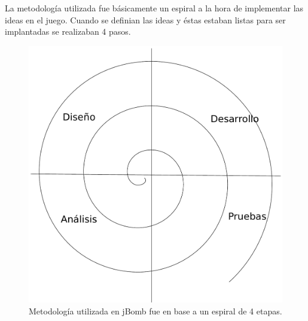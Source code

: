 \documentclass[a4paper,12pt,openany,oneside]{book}
\begin{document}
La metodología utilizada fue básicamente un espiral a la hora de implementar las ideas en el juego. Cuando se definian las ideas y éstas estaban listas para ser implantadas se realizaban 4 pasos.

\begin{figure}
\begin{center}
\includegraphics[scale=.4]{espiral.pdf} 
\end{center}
\caption[Metodología en espiral]{Metodología utilizada en jBomb fue en base a un espiral de 4 etapas.}
\end{figure}
\end{document}
